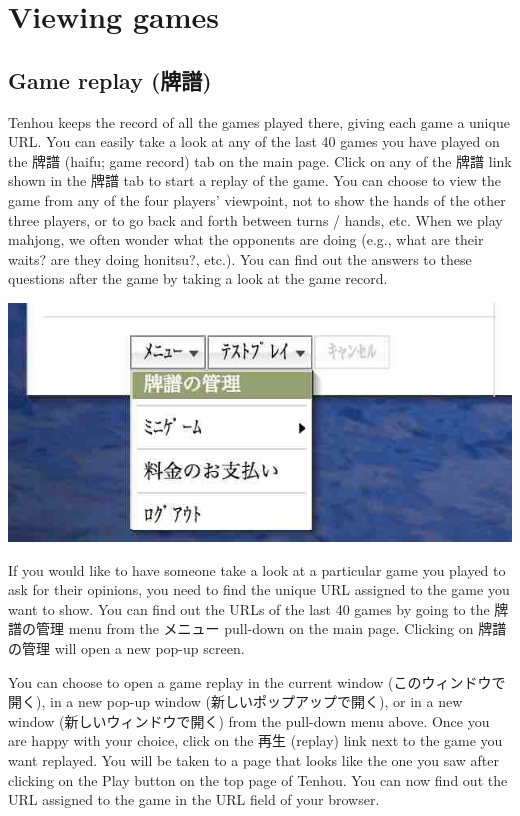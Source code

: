 \section{Viewing games}
\subsection{Game replay (牌譜)}
{\jap Tenhou} keeps the record of all the games played there, giving each game a unique URL. 
You can easily take a look at any of the last 40 games you have played on the 牌譜 ({\jap haifu}; game record) tab on the main page. Click on any of the 牌譜 link shown in the 牌譜 tab to start a replay of the game. You can choose to view the game from any of the four players' viewpoint, not to show the hands of the other three players, or to go back and forth between turns / hands, etc. When we play mahjong, we often wonder what the opponents are doing (e.g., what are their waits? are they doing {\jap honitsu}?, etc.). You can find out the answers to these questions after the game by taking a look at the game record. 


\begin{center}
\includegraphics[width=.4\textwidth,clip]{figs/haifukanri.jpg}
\end{center}

If you would like to have someone take a look at a particular game you played to ask for their opinions, you need to find the unique URL assigned to the game you want to show. You can find out the URLs of the last 40 games by going to the 牌譜の管理 menu from the メニュー pull-down on the main page. 
Clicking on 牌譜の管理 will open a new pop-up screen.

\bigskip
You can choose to open a game replay in the current window (このウィンドウで開く), in a new pop-up window (新しいポップアップで開く), or in a new window (新しいウィンドウで開く) from the pull-down menu above. Once you are happy with your choice, click on the 再生 (replay) link next to the game you want replayed. 
You will be taken to a page that looks like the one you saw after clicking on the Play button on the top page of {\jap Tenhou}. You can now find out the URL assigned to the game in the URL field of your browser. 

